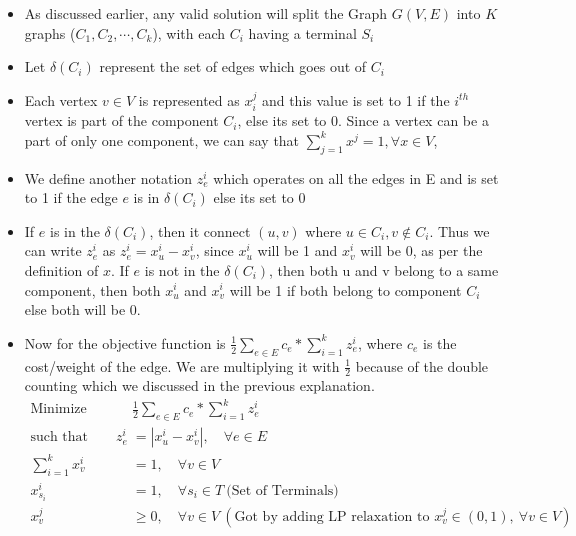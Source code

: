 \documentclass[11pt]{article}
\begin{document}
\begin{itemize} \itemsep -3pt
    \item As discussed earlier, any valid solution will split the Graph $G(V,E)$ into $K$ graphs ($C_1, C_2,\cdots,C_k$), with each $C_i$ having a terminal $S_i$
    \item Let $\delta(C_i)$ represent the set of edges which goes out of $C_i$
    \item Each vertex $v \in V$ is represented as $x_i^j$ and this value is set to 1 if the $i^{th}$ vertex is part of the component $C_i$, else its set to 0. Since a vertex can be a part of only one component, we can say that $\sum_{j=1}^{k}{x^j} = 1, \forall x \in V$, 
    \item We define another notation $z_e^i$ which operates on all the edges in E and is set to 1 if the edge $e$ is in $\delta(C_i)$ else its set to 0
    \item If $e$ is in the $\delta(C_i)$, then it connect $(u,v)$ where $u \in C_i, v \notin C_i$. Thus we can write $z_e^i$ as $z_e^i = x_u^i - x_v^i$, since $x_u^i$ will be 1 and $x_v^i$ will be 0, as per the definition of $x$. If $e$ is not in the $\delta(C_i)$, then both u and v belong to a same component, then both $x_u^i$ and $x_v^i$ will be 1 if both belong to component $C_i$ else both will be 0.
    \item Now for the objective function is $\frac{1}{2}\sum\limits_{e \in E}{c_e * \sum\limits_{i=1}^{k}{z_e^i}}$, where $c_e$ is the cost/weight of the edge. We are multiplying it with $\frac{1}{2}$ because of the double counting which we discussed in the previous explanation.
\begin{align*}
\text{Minimize} \qquad & \frac{1}{2}\sum\limits_{e \in E}{c_e * \sum\limits_{i=1}^{k}{z_e^i}}\\
\text{such that}  \qquad z_e^i &= |x_u^i - x_v^i|, \quad \forall e \in E\\
\sum\limits_{i=1}^{k}{x_v^i} &= 1,\quad \forall v \in V\\
x_{s_i}^i &= 1,\quad \forall s_i \in T \ \text{(Set of Terminals)}\\
x_v^j &\ge 0, \quad \forall v \in V \ (\text{Got by adding LP relaxation to }x_v^j \in (0,1),\ \forall v \in V)
\end{align*}
\end{itemize}
\end{document}
